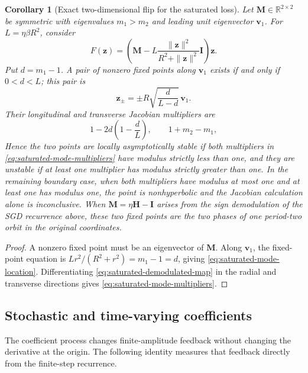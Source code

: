 \documentclass[11pt]{article}
\newtheorem{corollary}[theorem]{Corollary}
\theoremstyle{definition}
\newcommand{\R}{\mathbb R}
\newcommand{\Id}{\mathbf I}
\newcommand{\vvec}{\mathbf v}
\begin{document}
\begin{corollary}[Exact two-dimensional flip for the saturated loss]
\label{cor:saturated-flip}
Let $\mathbf M\in\R^{2\times2}$ be symmetric with eigenvalues $m_1>m_2$ and leading unit
eigenvector $\vvec_1$.  For $L=\eta\beta R^2$, consider
\begin{equation}
 F(\mathbf z)=\left(\mathbf M
 -L\frac{\|\mathbf z\|^2}{R^2+\|\mathbf z\|^2}\Id\right)\mathbf z.
 \label{eq:saturated-demodulated-map}
\end{equation}
Put $d=m_1-1$.  A pair of nonzero fixed points along $\vvec_1$ exists if and
only if $0<d<L$; this pair is
\begin{equation}
 \mathbf z_\pm=\pm R\sqrt{\frac{d}{L-d}}\,\vvec_1.
 \label{eq:saturated-mode-location}
\end{equation}
Their longitudinal and transverse Jacobian multipliers are
\begin{equation}
 1-2d\left(1-\frac dL\right),
 \qquad 1+m_2-m_1,
 \label{eq:saturated-mode-multipliers}
\end{equation}
Hence the two points are locally asymptotically stable if both multipliers
in \eqref{eq:saturated-mode-multipliers} have modulus strictly less than one,
and they are unstable if at least one multiplier has modulus strictly greater
than one.  In the remaining boundary case, when both multipliers have modulus
at most one and at least one has modulus one, the point is nonhyperbolic and
the Jacobian calculation alone is inconclusive.  When
$\mathbf M=\eta\mathbf H-\mathbf I$ arises from the sign
demodulation of the SGD recurrence above, these two fixed points are the two
phases of one period-two orbit in the original coordinates.
\end{corollary}

\begin{proof}
A nonzero fixed point must be an eigenvector of $\mathbf M$.  Along
$\vvec_1$, the fixed-point equation is
$Lr^2/(R^2+r^2)=m_1-1=d$, giving
\eqref{eq:saturated-mode-location}.  Differentiating
\eqref{eq:saturated-demodulated-map} in the radial and transverse directions
gives \eqref{eq:saturated-mode-multipliers}.
\end{proof}

\subsection{Stochastic and time-varying coefficients}

The coefficient process changes finite-amplitude feedback without changing
the derivative at the origin.  The following identity measures that feedback
directly from the finite-step recurrence.
\end{document}
